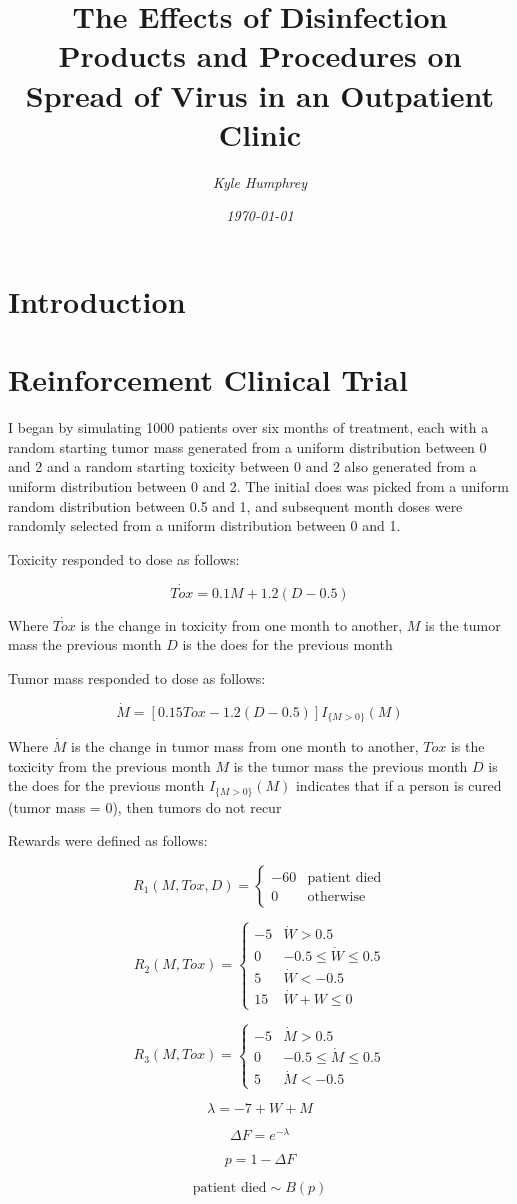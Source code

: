 \documentclass[12pt]{article}
\title{\normalfont \Large The Effects of Disinfection Products and Procedures on Spread of Virus in an Outpatient Clinic}
\author{\normalsize \sl Kyle Humphrey}
\date{\normalsize \sl \today}
\begin{document}
\maketitle

\section{Introduction}

\section{Reinforcement Clinical Trial}


I began by simulating 1000 patients over six months of treatment, each with a random starting tumor mass generated from a uniform distribution between 0 and 2 and a random starting toxicity between 0 and 2 also generated from a uniform distribution between 0 and 2. The initial does was picked from a uniform random distribution between 0.5 and 1, and subsequent month doses were randomly selected from a uniform distribution between 0 and 1.

Toxicity responded to dose as follows:

\[
\dot{Tox} = 0.1 M + 1.2 (D - 0.5)
\]

Where $\dot{Tox}$ is the change in toxicity from one month to another, 
$M$ is the tumor mass the previous month
$D$ is the does for the previous month

Tumor mass responded to dose as follows:

\[
\dot{M} = [0.15 Tox - 1.2 (D - 0.5)] I_{\{M > 0\}}(M)
\]

Where $\dot{M}$ is the change in tumor mass from one month to another,
$Tox$ is the toxicity from the previous month 
$M$ is the tumor mass the previous month
$D$ is the does for the previous month
$I_{\{M > 0\}}(M)$ indicates that if a person is cured (tumor mass = 0), then tumors do not recur


Rewards were defined as follows:

\[
R_{1}(M, Tox, D) = 
\begin{cases}
  -60 & \text{patient died} \\
  0 & \text{otherwise}
\end{cases}
\]

\[
R_{2}(M, Tox) = 
\begin{cases}
  -5 & \dot{W} > 0.5 \\
  0 & -0.5 \leq \dot{W} \leq 0.5 \\
  5 & \dot{W} < -0.5 \\
  15 & \dot{W} + W \leq 0
\end{cases}
\]

\[
R_{3}(M, Tox) = 
\begin{cases}
  -5 & \dot{M} > 0.5 \\
  0 & -0.5 \leq \dot{M} \leq 0.5 \\
  5 & \dot{M} < -0.5
\end{cases}
\]

\[
\lambda = -7 + W + M
\]

\[
\Delta F = e^{-\lambda}
\]

\[
p = 1 - \Delta F
\]

\[
\text{patient died} \sim B(p)
\]
\end{document}
